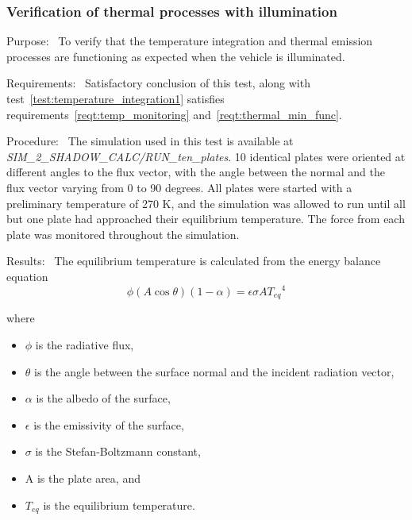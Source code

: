  \subsubsection{Verification of thermal processes with illumination}
  \label{test:temperature_integration2}
  \begin{description}
  \item{Purpose:}\ \newline
    To verify that the temperature integration and thermal emission processes
    are functioning as expected when the vehicle is illuminated.
  \item{Requirements:}\ \newline
    Satisfactory conclusion of this test, along with test~\ref{test:temperature_integration1} satisfies requirements~\ref{reqt:temp_monitoring} and~\ref{reqt:thermal_min_func}.
    
  \item{Procedure:}\ \newline
  The simulation used in this test is available at \textit{SIM\_2\_SHADOW\_CALC/RUN\_ten\_plates}.
    10 identical plates were oriented at different angles to the flux
    vector, with the angle between the normal and the flux vector varying
    from 0 to 90 degrees.  All plates were started with a preliminary
    temperature of 270 K, and the simulation was allowed to run until all but
    one plate had approached their equilibrium temperature.  The force from each plate
    was monitored throughout the simulation. 
  \item{Results:}\ \newline
    The equilibrium temperature is calculated from the energy balance equation
    \begin{equation}
      \phi (A\cos \theta )(1-\alpha )=\epsilon \sigma A{T_{\mathit{eq}}}^{4}
    \end{equation}
        
    where
    \begin{itemize}
      \item{} 
        $\phi$ is the radiative flux, 
      \item{} 
        $\theta$ is the angle between the surface normal and the incident
        radiation vector, 
      \item{}
        $\alpha$ is the albedo of the surface, 
      \item{}
        $\epsilon$ is the emissivity of the surface, 
      \item{}
        $\sigma$ is the Stefan-Boltzmann constant, 
      \item{}
        A is the plate area, and
      \item{}  
        $T_{\mathit{eq}}$ is the equilibrium temperature.
    \end{itemize}


\end{description}
